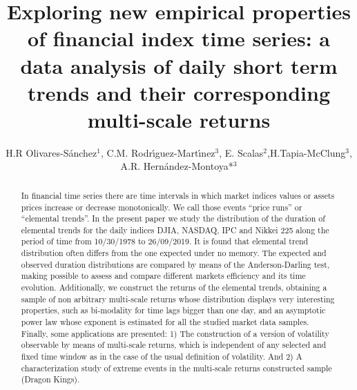 \documentclass[a4paper]{jpconf}
\begin{document}
\title{Exploring new empirical properties of  financial index time series: a data analysis of daily short term trends and their corresponding multi-scale returns}


\author{H.R Olivares-S\'anchez$^1$, C.M. Rodr\'{\i}guez-Mart\'{\i}nez$^3$, E. Scalas$^2$,H.Tapia-McClung$^3$, A.R. Hern\'andez-Montoya*$^3$}

\address{$^1$Department of Astrophysics, Radboud University, P.O. Box 9010, 6500 GL Nijmegen, The Netherlands.}

\address{$^2$Centro de Investigaci\'on en Inteligencia Artificial. Universidad Veracruzana. Sebasti\'an Camacho 5, Xalapa Veracruz 91000, M\'exico. Tel/Fax: 52-228-8172957/8172855.}

\address{$^3$Department of Mathematics, School of Mathematical and Physical Sciences, University of Sussex, Brighton, BN1 9QH, United Kingdom.}

\address{$^4$Facultad de F\'{\i}sica. Universidad Veracruzana, Apdo. Postal 475. Xalapa, Veracruz. M\'{e}xico.}




\begin{abstract}
   In financial time series there are time intervals in which market indices values or assets prices increase or decrease monotonically. We call those events ``price runs''  or ``elemental trends''. In the present paper  we study  the distribution of the  duration of elemental trends for the daily indices DJIA, NASDAQ, IPC and Nikkei 225 along the period of time from 10/30/1978  to 26/09/2019.  It is found that elemental trend distribution often differs from the one expected under no memory.  The expected and observed duration distributions are compared by means of the Anderson-Darling test, making possible to assess and compare different markets efficiency and its time evolution.  Additionally, we construct  the returns of the elemental trends,  obtaining a sample of non arbitrary  multi-scale returns whose distribution displays very interesting properties, such as  bi-modality for time lags bigger than one day, and an asymptotic power law whose exponent is estimated for all the studied market data samples. Finally, some applications are presented: 1) The construction of a version of volatility observable by means of multi-scale returns, which is  independent of any selected and fixed time window as in the case of the usual definition of volatility.  And 2)  A characterization  study  of extreme events in  the multi-scale returns constructed sample (Dragon Kings).
\end{abstract}
\end{document}

